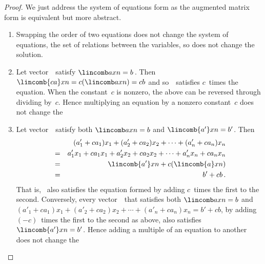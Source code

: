 \begin{proof} 
We just address the system of equations form as the augmented matrix form is equivalent but more abstract.
\begin{enumerate}
\item Swapping the order of two equations does not change the system of equations, the set of relations between the variables, so does not change the solution.
\item Let vector~\xv\ satisfy \(\lincomb axn=b\)\,.
Then \(\lincomb{ca}xn=c(\lincomb axn)=cb\) and so~\xv\ satisfies \(c\)~times the equation.
When the constant~\(c\) is nonzero, the above can be reversed through dividing by~\(c\).
Hence multiplying an equation by a nonzero constant~\(c\) does not change the 

\item 
Let vector~\xv\ satisfy both \(\lincomb axn=b\) and \(\lincomb{a'}xn=b'\).
Then
\begin{eqnarray*}
&&(a'_1+ca_1)x_1+(a'_2+ca_2)x_2+\cdots+(a'_n+ca_n)x_n
\\&=&a'_1x_1+ca_1x_1+a'_2x_2+ca_2x_2+\cdots+a'_nx_n+ca_nx_n
\\&=&\lincomb{a'}xn +c(\lincomb{a}xn)
\\&=&b'+cb\,.
\end{eqnarray*}
That is, \xv~also satisfies the equation formed by adding \(c\)~times the first to the second.
Conversely, every vector~\xv\ that satisfies both \(\lincomb axn=b\) and \((a'_1+ca_1)x_1+(a'_2+ca_2)x_2+\cdots+(a'_n+ca_n)x_n=b'+cb\), by adding \((-c)\)~times the first to the second as above, also satisfies \(\lincomb{a'}xn=b'\).
Hence adding a multiple of an equation to another does not change the 

\end{enumerate}
\end{proof}



